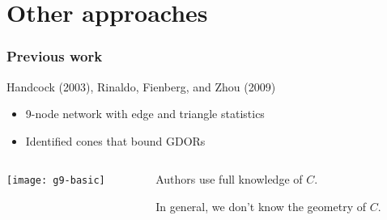\documentclass[ 10pt]{beamer}
\newcommand{\yobs}{y_{\text{obs}}}
\begin{document}
\section{Other approaches}
\frame
{
  \frametitle{Previous work}  
Handcock (2003), Rinaldo, Fienberg, and Zhou (2009)
\begin{itemize}
	\item 9-node network with edge and triangle statistics
	\item Identified cones that bound GDORs %
\end{itemize}

\begin{columns}[]
\begin{column}[T]{0.4\textwidth}
\texttt{[image: g9-basic]}
\end{column}

\begin{column}[t]{0.60\textwidth}
\vspace{1mm}

Authors use full knowledge of $C$.  

\vspace{1mm}

\pause
\begin{block}{}
{\alert{In general, we don't know the geometry of $C$.} }
\end{block}
\end{column}
\end{columns}


}

\end{document}
